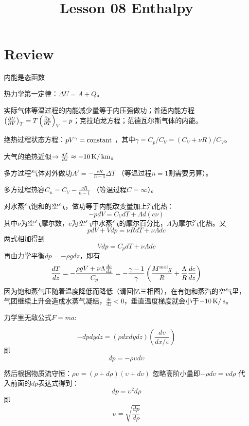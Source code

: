 \documentclass[CJK]{beamer}
\title{Lesson 08 Enthalpy}
\author{}
\date{}
\begin{document}

\section{Review}

\begin{frame}
\bch
\bitem
\item{内能是态函数}
\item{热力学第一定律：$\Delta U = A + Q$。}
\item{实际气体等温过程的内能减少量等于内压强做功；普适内能方程$\left(\frac{\partial U}{\partial V}\right)_{T} = T\left(\frac{\partial p}{\partial T}\right)_{V} - p$；克拉珀龙方程；范德瓦尔斯气体的内能。}
\item{绝热过程状态方程：$pV^\gamma = \mathrm{constant}$ ，其中$\gamma = C_p/C_V = (C_V + \nu R)/C_V$。}
\item{大气的绝热近似$\rightarrow \frac{dT}{dz} \approx -10 \,\mathrm{K}/\,\mathrm{km}$。}
\item{多方过程气体对外做功$A' = -\frac{\nu R}{n-1}\Delta T$ （等温过程$n=1$则需要另算）。}
\item{多方过程热容$C_n =C_V -\frac{\nu R}{n-1}$ （等温过程$C = \infty$）。}
\eitem
\ech
\end{frame}

\begin{frame}
\bch
{\small
对水蒸气饱和的空气，做功等于内能改变量加上汽化热：
$$ -pdV = C_V dT + \Lambda d(c\nu) $$
其中$\nu$为空气摩尔数，$c$为空气中水蒸气的摩尔百分比，$\Lambda$为摩尔汽化热。又
$$pdV + Vdp = \nu R dT + \nu \Lambda dc$$
两式相加得到
$$ Vdp = C_p  dT + \nu \Lambda dc $$
再由力学平衡$ dp = -\rho g dz$，即有
$$ \frac{dT}{dz} =-\frac{\rho g V + \nu\Lambda\frac{dc}{dz}}{C_p} = -\frac{\gamma-1}{\gamma}\left(\frac{M^{\rm mol}g}{R}+\frac{\Lambda}{R}\frac{dc}{dz}\right)$$
因为饱和蒸气压随着温度降低而降低（请回忆三相图），在有饱和蒸汽的空气里，气团继续上升会造成水蒸气凝结，$ \frac{dc}{dz} < 0 $，垂直温度梯度就会小于$-10\,\mathrm{K}/\,\mathrm{s}$。
}
\ech
\end{frame}


\begin{frame}
\bch


{\scriptsize
力学里无敌公式$F = ma$:

$$ -dp dy dz = (\rho dx dy dz) \left(\frac{d\upsilon}{dx/\upsilon}\right) $$
即
$$ dp = - \rho \upsilon d\upsilon $$

然后根据物质流守恒：$ \rho \upsilon = (\rho + d\rho)(\upsilon+d\upsilon)$
忽略高阶小量即$ -\rho d\upsilon = \upsilon d\rho$
代入前面的$dp$表达式得到：
$$ dp = \upsilon ^2 d\rho$$
即
$$\upsilon = \sqrt{\frac{dp}{d\rho}}$$
}
\ech
\end{frame}
\end{document}
